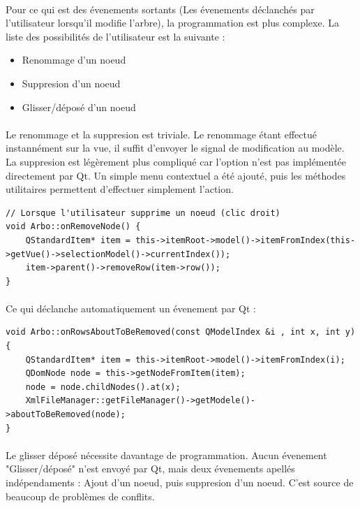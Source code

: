 \paragraph{}

Pour ce qui est des évenements sortants (Les évenements déclanchés par l'utilisateur lorsqu'il modifie l'arbre), la programmation
est plus complexe. La liste des possibilités de l'utilisateur est la suivante :

\begin{itemize}
\item Renommage d'un noeud
\item Suppresion d'un noeud
\item Glisser/déposé d'un noeud
\end{itemize}

\paragraph{}
Le renommage et la suppresion est triviale. Le renommage étant effectué instannément sur la vue, il suffit d'envoyer le signal de modification au modèle. La suppresion est légèrement plus compliqué car l'option n'est pas implémentée directement par Qt. Un simple menu contextuel a été ajouté, puis les méthodes utilitaires permettent d'effectuer simplement l'action.

\begin{lstlisting}
// Lorsque l'utilisateur supprime un noeud (clic droit)
void Arbo::onRemoveNode() {
    QStandardItem* item = this->itemRoot->model()->itemFromIndex(this->getVue()->selectionModel()->currentIndex());
    item->parent()->removeRow(item->row());
}
\end{lstlisting}

\paragraph{}
Ce qui déclanche automatiquement un évenement par Qt :
\begin{lstlisting}
void Arbo::onRowsAboutToBeRemoved(const QModelIndex &i , int x, int y)
{
    QStandardItem* item = this->itemRoot->model()->itemFromIndex(i);
    QDomNode node = this->getNodeFromItem(item);
    node = node.childNodes().at(x);
    XmlFileManager::getFileManager()->getModele()->aboutToBeRemoved(node);
}
\end{lstlisting}

\paragraph{}
Le glisser déposé nécessite davantage de programmation. Aucun évenement "Glisser/déposé" n'est envoyé par Qt, mais deux évenements apellés indépendaments : Ajout d'un noeud, puis suppresion d'un noeud. C'est source de beaucoup de problèmes de conflits.

